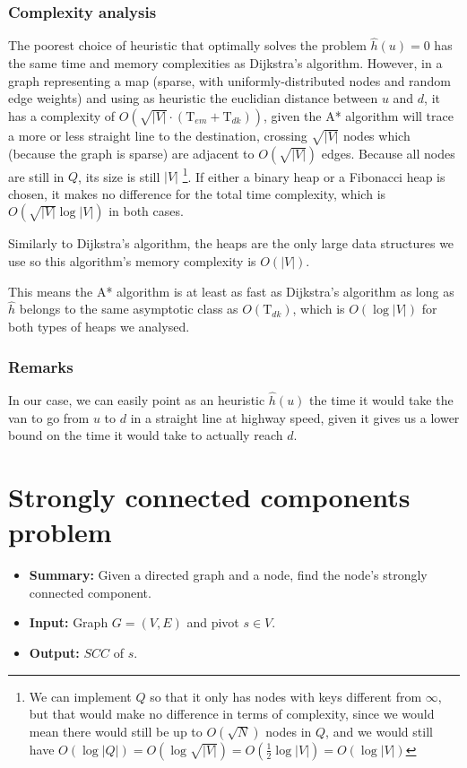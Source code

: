 \documentclass{report}[a4paper]
\theoremstyle{remark}
\begin{document}
\subsubsection{Complexity analysis}
The poorest choice of heuristic that optimally solves the problem $\hat{h}(u)=0$ has the same time and memory complexities as Dijkstra's algorithm. However, in a graph representing a map (sparse, with uniformly-distributed nodes and random edge weights) and using as heuristic the euclidian distance between $u$ and $d$, it has a complexity of $O(\sqrt{|V|} \cdot (\text{T}_{em}+\text{T}_{dk}))$, given the A* algorithm will trace a more or less straight line to the destination, crossing $\sqrt{|V|}$ nodes which (because the graph is sparse) are adjacent to $O(\sqrt{|V|})$ edges. Because all nodes are still in $Q$, its size is still $|V|$ \footnote{We can implement $Q$ so that it only has nodes with keys different from $\infty$, but that would make no difference in terms of complexity, since we would mean there would still be up to $O(\sqrt{N})$ nodes in $Q$, and we would still have $O(\log |Q|)=O(\log \sqrt{|V|})=O(\frac{1}{2}\log |V|)=O(\log |V|)$}.
If either a binary heap or a Fibonacci heap is chosen, it makes no difference for the total time complexity, which is $O(\sqrt{|V|} \log |V|)$ in both cases.\par
Similarly to Dijkstra's algorithm, the heaps are the only large data structures we use so this algorithm's memory complexity is $O(|V|)$.\par
This means the A* algorithm is at least as fast as Dijkstra's algorithm as long as $\hat{h}$ belongs to the same asymptotic class as $O(\text{T}_{dk})$, which is $O(\log |V|)$ for both types of heaps we analysed.
\subsubsection{Remarks}
In our case, we can easily point as an heuristic $\hat{h}(u)$ the time it would take the van to go from $u$ to $d$ in a straight line at highway speed, given it gives us a lower bound on the time it would take to actually reach $d$.
\section{Strongly connected components problem}
\begin{itemize}
    \item \textbf{Summary:} Given a directed graph and a node, find the node's strongly connected component.
    \item \textbf{Input:} Graph $G=(V,E)$ and pivot $s \in V$.
    \item \textbf{Output:} $SCC$ of $s$.
\end{itemize}
\end{document}
